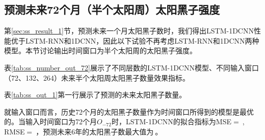 \subsection{预测未来72个月（半个太阳周）太阳黑子强度}\label{sec:ss_result_72}

第\ref{sec:ss_result_1}节，预测未来一个月太阳黑子数时，我们得出LSTM-1DCNN性能优于LSTM-RNN和1DCNN，因此以下试验不再考虑LSTM-RNN和1DCNN两种模型。本节讨论输出时间窗口为半个太阳周的太阳黑子强度。

表\ref{tab:ss_number_out_72}展示了不同层数的LSTM-1DCNN模型、不同输入窗口（72、132、264）未来半个太阳周太阳黑子数量效果指标。

表\ref{tab:ss_out_1}第一行展示了预测的未来太阳黑子数量。

就输入窗口而言，历史72个月的太阳黑子数量作为时间窗口所得到的模型是最优的。当输入时间窗口为72个月$O_{-72}$时，LSTM-1DCNN的拟合指标为MSE$=\SI{}{}$, RMSE$=\SI{}{}$，预测未来6年的太阳黑子数最大值为$\SI{}{}$。

